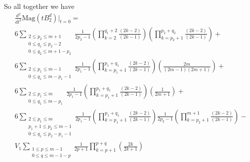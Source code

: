 \documentclass[11pt]{article}
\theoremstyle{mythm}
\begin{document}
So all together we have
\begin{align*}
&\frac{d^2}{dt^2}\text{Mag}(tB_2^d)\big\vert_{t=0} = \\
&6\sum\limits_{\substack{2\leq p_2\leq m+1 \\ 0\leq q_1 \leq p_2-2 \\ 0\leq q_2 \leq m+1-p_2}}\frac{1}{2p_2-1}\left(\prod\limits_{k=2}^{q_1+2}\frac{(2k-2)}{(2k-1)}\right)\left(\prod\limits_{k=p_2+1}^{p_2+q_2}\frac{(2k-2)}{(2k-1)}\right) + \\
&6\sum\limits_{\substack{2\leq p_1\leq m-1 \\ 0\leq q_1\leq m-p_1-1}}\frac{1}{2p_1-1}\left(\prod\limits_{k=p_1+1}^{p_1+q_1}\frac{(2k-2)}{(2k-1)}\right)\left(\frac{2m}{(2m-1)(2m+1)}\right) + \\
&6\sum\limits_{\substack{2\leq p_1\leq m \\ 0\leq q_1\leq m-p_1}}\frac{1}{2p_1-1}\left(\prod\limits_{k=p_1+1}^{p_1+q_1}\frac{(2k-2)}{(2k-1)}\right)\left(\frac{1}{2m+1}\right) + \\
&6\sum\limits_{\substack{2\leq p_1\leq m \\ p_1+1\leq p_2 \leq m-1 \\ 0\leq q_1\leq p_2-p_1-1 }}\frac{1}{2p_1-1}\left(\prod\limits_{k=p_1+1}^{p_1+q_1}\frac{(2k-2)}{(2k-1)}\right)\frac{1}{2p_2-1}\left(\prod\limits_{k=p_2+1}^{m+1}\frac{(2k-2)}{(2k-1)}\right) - \\
&V_{1}\sum\limits_{\substack{1\leq p \leq m-1 \\ 0 \leq q \leq m - 1 - p}}\frac{1}{2p+1}\prod\limits_{k=p+1}^{p+q}\left(\frac{2k}{2k+1}\right)
\end{align*}
\end{document}
